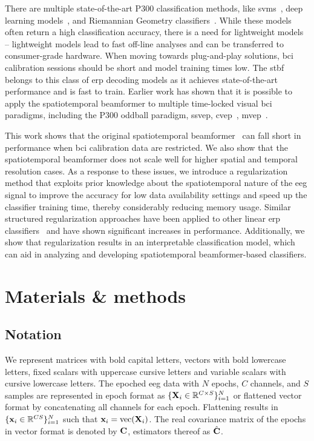   There are multiple state-of-the-art P300 classification methods, like
  \acp{svm}~\cite{Tayeb2014}, deep
	learning models~\cite{Vareka2020,Borra2020}, and Riemannian Geometry
	classifiers~\cite{Barachant2014}.
	While these models often return a high classification accuracy, there is a need
	for lightweight models -- lightweight models lead to fast off-line analyses and can be transferred to consumer-grade hardware.
	When moving towards plug-and-play solutions, \ac{bci} calibration sessions should be short and model training times low.
  The \ac{stbf}~\cite{VanVliet2015, Wittevrongel2016} belongs to
	this class of \ac{erp} decoding models as it achieves state-of-the-art performance and is fast to train.
	Earlier work has shown that it is
	possible to apply the spatiotemporal beamformer to multiple time-locked visual
  \ac{bci} paradigms, including the P300 oddball paradigm, \ac{ssvep},
  \ac{cvep}~\cite{Wittevrongel2017a}, \ac{mvep}~\cite{Libert2021}.

	This work shows that the original spatiotemporal
	beamformer~\cite{Wittevrongel2016} can fall short in performance when \ac{bci}
	calibration data are restricted.
	We also show that the spatiotemporal beamformer does not scale well for
	higher spatial and temporal resolution cases.
	As a response to these issues, we introduce a regularization method that
	exploits prior knowledge about the spatiotemporal nature of the \ac{eeg} signal to
	improve the accuracy for low data availability settings and speed up the
	classifier training time, thereby considerably reducing memory usage.
	Similar structured regularization approaches have been applied to other linear
	\ac{erp} classifiers~\cite{GonzalezNavarro2017, Vliet2020} and have shown
	significant increases in performance.
	Additionally, we show that regularization results in an interpretable
	classification model, which can aid in analyzing and developing spatiotemporal beamformer-based classifiers.

	\section{Materials \& methods}
	\subsection{Notation}
	We represent matrices with bold capital letters, vectors with bold
	lowercase letters, fixed scalars with uppercase cursive letters and variable
  scalars with cursive lowercase letters.
	The epoched \ac{eeg} data with $N$ epochs, $C$ channels, and $S$ samples are
  represented in epoch format as $\{\mathbf{X}_i\in\mathbb{R}^{C\times S}\}^N_{i=1}$
  or flattened vector format by concatenating all channels for each epoch.
	Flattening results in $\{\mathbf{x}_i\in\mathbb{R}^{CS}\}^N_{i=1}$ such that
  $\mathbf{x}_i = \text{vec}(\mathbf{X}_i)$.
	The real covariance matrix of the epochs in vector format is
  denoted by $\mathbf{C}$, estimators thereof as $\hat{\mathbf{C}}$.

